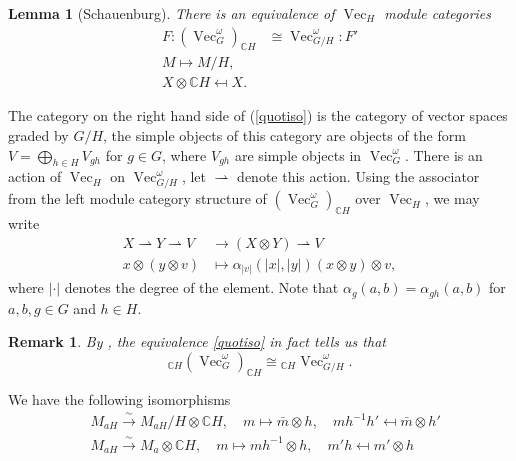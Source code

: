 \documentclass[a4paper, 10pt]{book}
\newtheorem{Lem}[theorem]{Lemma}
\newtheorem{Rem}[theorem]{Remark}
\theoremstyle{definition}
\numberwithin{equation}{chapter}
\newcommand\inv{^{-1}}
\newcommand\Vect{\operatorname{Vec}}
\newcommand\CC{\mathbb C}
\begin{document}
\begin{Lem}[Schauenburg]\label{equiv}
There is an equivalence of $\Vect_H$ module categories
\begin{align}
	F: (\Vect^\omega_G)_{\CC H} &\cong \Vect^\omega_{G/H}:F'\label{quotiso}\\	
	M\mapsto M/H \nonumber,\\
	X\otimes \CC H \mapsfrom X.\nonumber
\end{align}
\end{Lem}
The category on the right hand side of (\ref{quotiso}) is the category of vector spaces graded by $G/H$, the simple objects of this category are objects of the form $V = \bigoplus_{h\in H} V_{gh}$ for $g\in G$, where $V_{gh}$ are simple objects in $\Vect^\omega_G$.  There is an action of $\Vect_H$ on $\Vect^\omega_{G/H}$, let $\rightharpoonup$ denote this action. Using the associator from the left module category structure of $(\Vect^\omega_G)_{\CC H}$ over $\Vect_H$, we may write
\begin{align}
	X \rightharpoonup Y \rightharpoonup V &\rightarrow (X\otimes Y) \rightharpoonup V\\
	x\otimes (y \otimes v) &\mapsto \alpha_{|v|} (|x|, |y|)(x\otimes y)\otimes v,
\end{align}
where $|\cdot|$ denotes the degree of the element. Note that $\alpha_g(a, b) = \alpha_{gh}(a,b)$ for $a,b,g\in G$ and $h \in H$.
\begin{Rem}\label{directfactor}\rm
By \cite{Schauenburg_2015}, the equivalence \ref{quotiso} in fact tells us that \begin{equation*}
	{}_{\CC H} (\Vect^\omega_G)_{\CC H} \cong {}_{\CC H}\Vect^\omega_{G/H}.
\end{equation*}
\end{Rem}	

We have the following isomorphisms
\begin{align}
\label{rightHquotient1} &M_{aH} \overset{\sim} \longrightarrow M_{aH}/H \otimes \CC H, \quad 
m \mapsto \bar{m} \otimes h, 
 \quad mh\inv h' \mapsfrom \bar{m}\otimes h'  \\  \label{rightHquotient2} &M_{aH} \overset{\sim}\longrightarrow M_a \otimes \CC H,\quad  m\mapsto  mh\inv\otimes h, \quad m'h \mapsfrom m'\otimes h
 \end{align}
\end{document}
